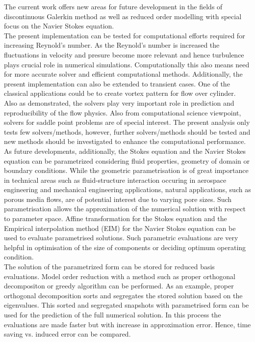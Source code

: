\documentclass[a4paper,twoside,openright]{book}
\begin{document}
The current work offers new areas for future development in the fields of discontinuous Galerkin method as well as reduced order modelling with special focus on the Navier Stokes equation. \\

The present implementation can be tested for computational efforts  required for increasing Reynold's number. As the Reynold's number is increased the fluctuations in velocity and presure become more relevant and hence turbulence plays crucial role in numerical simulations. Computationally this also means need for more accurate solver and efficient computational methods. Additionally, the present implementation can also be extended to transient cases. One of the classical applications could be to create vortex pattern for flow over cylinder.\\

Also as demonstrated, the solvers play very important role in prediction and reproducibility of the flow physics. Also from computational science viewpoint, solvers for saddle point problems are of special interest. The present analysis only tests few solvers/methods, however, further solvers/methods should be tested and new methods should be investigated to enhance the computational performance.\\

As future developments, additionally, the Stokes equation and the Navier Stokes equation can be parametrized considering fluid properties, geometry of domain or boundary conditions. While the geometric parametrisation is of great importance in technical areas such as fluid-structure interaction occuring in aerospace engineering and mechanical engineering applications, natural applications, such as porous media flows, are of potential interest due to varying pore sizes. Such parametrisation allows the approximation of the numerical solution with respect to parameter space. Affine transformation for the Stokes equation and the Empirical interpolation method (EIM) for the Navier Stokes equation can be used to evaluate parametrised solutions. Such parametric evaluations are very helpful in optimisation of the size of components or deciding optimum operating condition. \\

The solution of the parametrized form can be stored for reduced basis evaluations. Model order reduction with a method such as proper orthogonal decompositon or greedy algorithm can be performed. As an example, proper orthogonal decomposition sorts and segregates the stored solution based on the eigenvalues. This sorted and segregated snapshots with parametrised form can be used for the prediction of the full numerical solution. In this process the evaluations are made faster but with increase in approximation error. Hence, time saving vs. induced error can be compared.
\end{document}
